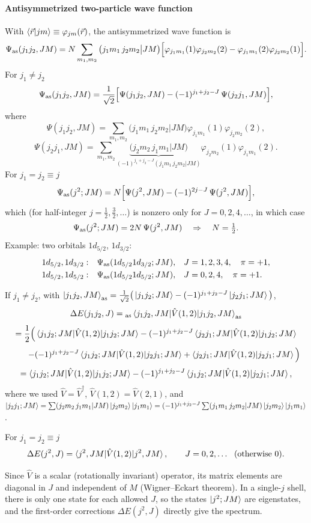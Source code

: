 \documentclass[11pt,a4paper]{article}
\newcommand{\op}[1]{\hat{#1}}
\begin{document}
\paragraph{Antisymmetrized two-particle wave function}
With $\braket{\vec r|jm}\equiv\varphi_{jm}(\vec r)$, the antisymmetrized wave function is
\[
\Psi_{\rm as}(j_1j_2,JM)=N\sum_{m_1,m_2}\big(j_1m_1\,j_2m_2\big|JM\big)\Big[\varphi_{j_1m_1}(1)\varphi_{j_2m_2}(2)-\varphi_{j_1m_1}(2)\varphi_{j_2m_2}(1)\Big].
\]
For $j_1\neq j_2$
\[
\Psi_{\rm as}(j_1j_2,JM)=\frac{1}{\sqrt2}\Big[\Psi(j_1j_2,JM)-(-1)^{j_1+j_2-J}\,\Psi(j_2j_1,JM)\Big],
\]
where
\[
\Psi(j_1j_2,JM)=\sum_{m_1,m_2}\big(j_1m_1\,j_2m_2\big|JM\big)\varphi_{j_1m_1}(1)\varphi_{j_2m_2}(2),
\]
\[
\Psi(j_2j_1,JM)=\sum_{m_1,m_2}\underbrace{\big(j_2m_2\,j_1m_1\big|JM\big)}_{(-1)^{j_1+j_2-J}(j_1m_1\,j_2m_2|JM)}\varphi_{j_2m_2}(1)\varphi_{j_1m_1}(2).
\]
For $j_1=j_2\equiv j$
\[
\Psi_{\rm as}(j^2;JM)=N\Big[\Psi(j^2,JM)-(-1)^{2j-J}\,\Psi(j^2,JM)\Big],
\]
which (for half-integer $j=\frac12,\frac32,\dots$) is nonzero only for $J=0,2,4,\dots$, in which case
\[
\Psi_{\rm as}(j^2;JM)=2N\,\Psi(j^2,JM)\quad\Rightarrow\quad N=\tfrac12 .
\]
Example: two orbitals $1d_{5/2}$, $1d_{3/2}$:
\[
\begin{array}{lll}
1d_{5/2},1d_{3/2}: & \Psi_{\rm as}(1d_{5/2}1d_{3/2};JM), & J=1,2,3,4,\quad \pi=+1,\\[1mm]
1d_{5/2},1d_{5/2}: & \Psi_{\rm as}(1d_{5/2}1d_{5/2};JM), & J=0,2,4,\quad \pi=+1.
\end{array}
\]

If $j_1\ne j_2$, with $\ket{j_1j_2,JM}_{\rm as}=\frac{1}{\sqrt2}\big(\ket{j_1j_2;JM}-(-1)^{j_1+j_2-J}\ket{j_2j_1;JM}\big)$,
\[
\Delta E(j_1j_2,J)={}_{\rm as}\braket{j_1j_2,JM|\op V(1,2)|j_1j_2,JM}_{\rm as}
\]
\[
=\frac12\Big(\braket{j_1j_2;JM|\op V(1,2)|j_1j_2;JM}-(-1)^{j_1+j_2-J}\braket{j_2j_1;JM|\op V(1,2)|j_1j_2;JM}
\]
\[
\qquad-(-1)^{j_1+j_2-J}\braket{j_1j_2;JM|\op V(1,2)|j_2j_1;JM}+\braket{j_2j_1;JM|\op V(1,2)|j_2j_1;JM}\Big)
\]
\[
=\braket{j_1j_2;JM|\op V(1,2)|j_1j_2;JM}-(-1)^{j_1+j_2-J}\braket{j_1j_2;JM|\op V(1,2)|j_2j_1;JM},
\]
where we used $\op V=\op V^\dagger$, $\op V(1,2)=\op V(2,1)$, and
$\ket{j_2j_1;JM}=\sum(j_2m_2\,j_1m_1|JM)\ket{j_2m_2}\ket{j_1m_1}=(-1)^{j_1+j_2-J}\sum(j_1m_1\,j_2m_2|JM)\ket{j_2m_2}\ket{j_1m_1}$.

For $j_1=j_2\equiv j$
\[
\Delta E(j^2,J)=\braket{j^2,JM|\op V(1,2)|j^2,JM},\qquad J=0,2,\dots\ \ (\text{otherwise }0).
\]

Since $\op V$ is a scalar (rotationally invariant) operator, its matrix elements are diagonal in $J$ and independent of $M$ (Wigner--Eckart theorem). In a single-$j$ shell, there is only one state for each allowed $J$, so the states $\ket{j^2;JM}$ are eigenstates, and the first-order corrections $\Delta E(j^2,J)$ directly give the spectrum.
\end{document}
